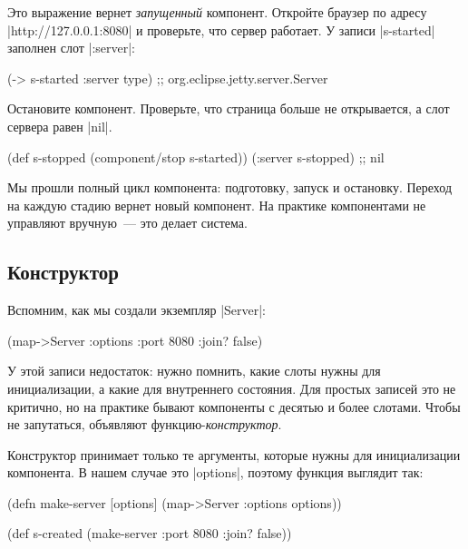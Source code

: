 Это выражение вернет \emph{запущенный} компонент. Откройте браузер по адресу
\spverb|http://127.0.0.1:8080| и проверьте, что сервер работает. У записи
\spverb|s-started| заполнен слот \spverb|:server|:

\begin{english}
  \begin{clojure}
(-> s-started :server type)
;; org.eclipse.jetty.server.Server
  \end{clojure}
\end{english}

Остановите компонент. Проверьте, что страница больше не открывается, а слот
сервера равен \spverb|nil|.

\begin{english}
  \begin{clojure}
(def s-stopped (component/stop s-started))
(:server s-stopped) ;; nil
  \end{clojure}
\end{english}

Мы прошли полный цикл компонента: подготовку, запуск и остановку. Переход на
каждую стадию вернет новый компонент. На практике компонентами не управляют
вручную~--- это делает система.

\subsection{Конструктор}

Вспомним, как мы создали экземпляр \spverb|Server|:

\begin{english}
  \begin{clojure}
(map->Server {:options {:port 8080 :join? false}})
  \end{clojure}
\end{english}

У этой записи недостаток: нужно помнить, какие слоты нужны для инициализации, а
какие для внутреннего состояния. Для простых записей это не критично, но на
практике бывают компоненты с десятью и более слотами. Чтобы не запутаться,
объявляют функцию-\emph{конструктор}.

Конструктор принимает только те аргументы, которые нужны для инициализации
компонента. В нашем случае это \spverb|options|, поэтому функция выглядит так:

\begin{english}
  \begin{clojure}
(defn make-server
  [options]
  (map->Server {:options options}))

(def s-created (make-server {:port 8080 :join? false}))
  \end{clojure}
\end{english}

